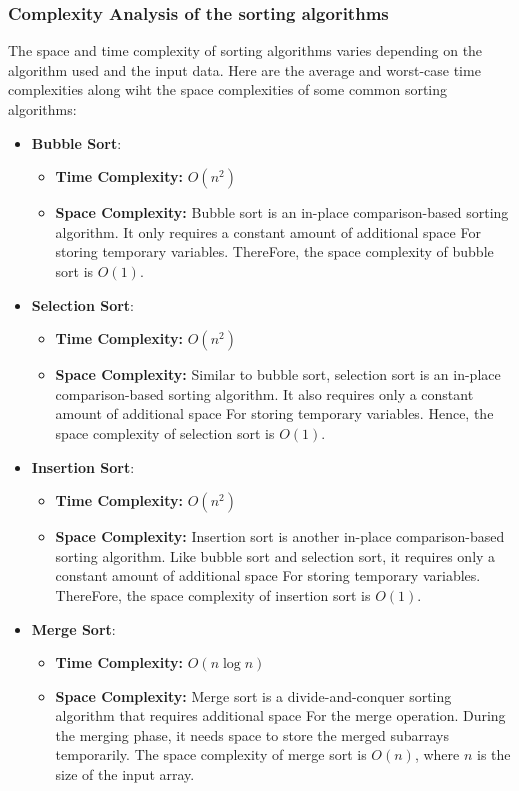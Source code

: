 \documentclass[12pt]{book} %
\begin{document}
\subsubsection{Complexity Analysis of the sorting algorithms}

The space and time complexity of sorting algorithms varies depending on the algorithm used and the input data. Here are the average and worst-case time complexities along wiht the space complexities of some common sorting algorithms:

\begin{itemize}
    \item \textbf{Bubble Sort}: 
    \begin{itemize}
        \item \textbf{Time Complexity: }$O(n^2)$
        \item \textbf{Space Complexity: }Bubble sort is an in-place comparison-based sorting algorithm. It only requires a constant amount of additional space For storing temporary variables. ThereFore, the space complexity of bubble sort is \(O(1)\).
    \end{itemize}
    
    \item \textbf{Selection Sort}: 
    \begin{itemize}
        \item \textbf{Time Complexity: }$O(n^2)$
        \item \textbf{Space Complexity: }Similar to bubble sort, selection sort is an in-place comparison-based sorting algorithm. It also requires only a constant amount of additional space For storing temporary variables. Hence, the space complexity of selection sort is \(O(1)\).
        \end{itemize}
    
    \item \textbf{Insertion Sort}: 
    \begin{itemize}
        \item \textbf{Time Complexity: }$O(n^2)$
        \item \textbf{Space Complexity: }Insertion sort is another in-place comparison-based sorting algorithm. Like bubble sort and selection sort, it requires only a constant amount of additional space For storing temporary variables. ThereFore, the space complexity of insertion sort is \(O(1)\).
        \end{itemize}
    
    \item \textbf{Merge Sort}:
    \begin{itemize}
        \item \textbf{Time Complexity: }$O(n \log n)$
        \item \textbf{Space Complexity: }Merge sort is a divide-and-conquer sorting algorithm that requires additional space For the merge operation. During the merging phase, it needs space to store the merged subarrays temporarily. The space complexity of merge sort is \(O(n)\), where \(n\) is the size of the input array.
        \end{itemize}
          

\end{itemize}
\end{document}
